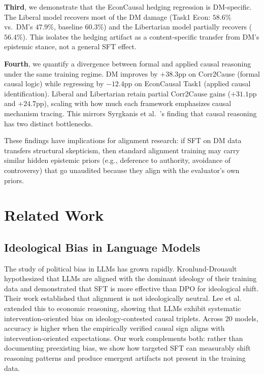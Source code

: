 \documentclass[sigconf]{acmart}
\begin{document}
\textbf{Third}, we demonstrate that the EconCausal hedging regression is DM-specific. The Liberal model recovers most of the DM damage (Task1 Econ: $58.6\%$ vs.\ DM's $47.9\%$, baseline $60.3\%$) and the Libertarian model partially recovers ($56.4\%$). This isolates the hedging artifact as a content-specific transfer from DM's epistemic stance, not a general SFT effect.

\textbf{Fourth}, we quantify a divergence between formal and applied causal reasoning under the same training regime. DM improves by $+38.3$pp on Corr2Cause (formal causal logic) while regressing by $-12.4$pp on EconCausal Task1 (applied causal identification). Liberal and Libertarian retain partial Corr2Cause gains ($+31.1$pp and $+24.7$pp), scaling with how much each framework emphasizes causal mechanism tracing. This mirrors Syrgkanis et al.~\cite{syrgkanis2026causalreasoning}'s finding that causal reasoning has two distinct bottlenecks.

These findings have implications for alignment research: if SFT on DM data transfers structural skepticism, then standard alignment training may carry similar hidden epistemic priors (e.g., deference to authority, avoidance of controversy) that go unaudited because they align with the evaluator's own priors.

\section{Related Work}

\subsection{Ideological Bias in Language Models}

The study of political bias in LLMs has grown rapidly. Kronlund-Drouault~\cite{kronlund2024propaganda} hypothesized that LLMs are aligned with the dominant ideology of their training data and demonstrated that SFT is more effective than DPO for ideological shift. Their work established that alignment is not ideologically neutral. Lee et al.~\cite{lee2026ideological} extended this to economic reasoning, showing that LLMs exhibit systematic intervention-oriented bias on ideology-contested causal triplets. Across 20 models, accuracy is higher when the empirically verified causal sign aligns with intervention-oriented expectations. Our work complements both: rather than documenting preexisting bias, we show how targeted SFT can measurably shift reasoning patterns and produce emergent artifacts not present in the training data.
\end{document}
